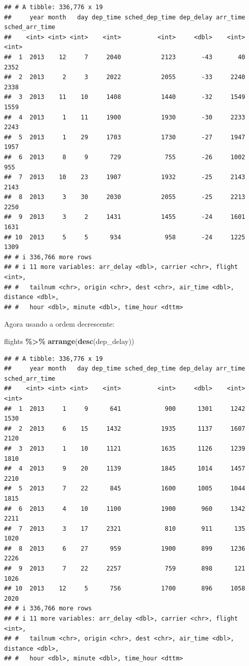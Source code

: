 \documentclass[
]{book}
\newenvironment{Shaded}{\begin{snugshade}}{\end{snugshade}}
\newcommand{\FunctionTok}[1]{\textcolor[rgb]{0.13,0.29,0.53}{\textbf{#1}}}
\newcommand{\NormalTok}[1]{#1}
\newcommand{\SpecialCharTok}[1]{\textcolor[rgb]{0.81,0.36,0.00}{\textbf{#1}}}
\begin{document}
\begin{verbatim}
## # A tibble: 336,776 x 19
##     year month   day dep_time sched_dep_time dep_delay arr_time sched_arr_time
##    <int> <int> <int>    <int>          <int>     <dbl>    <int>          <int>
##  1  2013    12     7     2040           2123       -43       40           2352
##  2  2013     2     3     2022           2055       -33     2240           2338
##  3  2013    11    10     1408           1440       -32     1549           1559
##  4  2013     1    11     1900           1930       -30     2233           2243
##  5  2013     1    29     1703           1730       -27     1947           1957
##  6  2013     8     9      729            755       -26     1002            955
##  7  2013    10    23     1907           1932       -25     2143           2143
##  8  2013     3    30     2030           2055       -25     2213           2250
##  9  2013     3     2     1431           1455       -24     1601           1631
## 10  2013     5     5      934            958       -24     1225           1309
## # i 336,766 more rows
## # i 11 more variables: arr_delay <dbl>, carrier <chr>, flight <int>,
## #   tailnum <chr>, origin <chr>, dest <chr>, air_time <dbl>, distance <dbl>,
## #   hour <dbl>, minute <dbl>, time_hour <dttm>
\end{verbatim}

Agora usando a ordem decrescente:

\begin{Shaded}
\begin{Highlighting}[]
\NormalTok{flights }\SpecialCharTok{\%\textgreater{}\%} \FunctionTok{arrange}\NormalTok{(}\FunctionTok{desc}\NormalTok{(dep\_delay))}
\end{Highlighting}
\end{Shaded}

\begin{verbatim}
## # A tibble: 336,776 x 19
##     year month   day dep_time sched_dep_time dep_delay arr_time sched_arr_time
##    <int> <int> <int>    <int>          <int>     <dbl>    <int>          <int>
##  1  2013     1     9      641            900      1301     1242           1530
##  2  2013     6    15     1432           1935      1137     1607           2120
##  3  2013     1    10     1121           1635      1126     1239           1810
##  4  2013     9    20     1139           1845      1014     1457           2210
##  5  2013     7    22      845           1600      1005     1044           1815
##  6  2013     4    10     1100           1900       960     1342           2211
##  7  2013     3    17     2321            810       911      135           1020
##  8  2013     6    27      959           1900       899     1236           2226
##  9  2013     7    22     2257            759       898      121           1026
## 10  2013    12     5      756           1700       896     1058           2020
## # i 336,766 more rows
## # i 11 more variables: arr_delay <dbl>, carrier <chr>, flight <int>,
## #   tailnum <chr>, origin <chr>, dest <chr>, air_time <dbl>, distance <dbl>,
## #   hour <dbl>, minute <dbl>, time_hour <dttm>
\end{verbatim}
\end{document}
